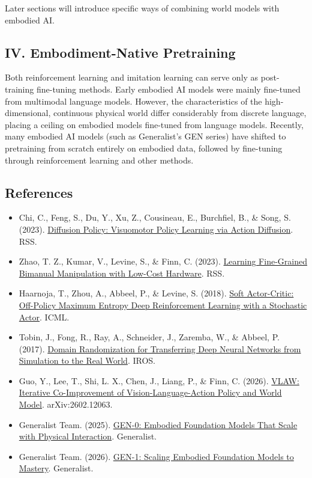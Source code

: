 Later sections will introduce specific ways of combining world models with embodied AI.

\hypertarget{iv.-embodiment-native-pretraining}{%
\subsection{IV. Embodiment-Native Pretraining}\label{iv.-embodiment-native-pretraining}}

Both reinforcement learning and imitation learning can serve only as post-training fine-tuning methods. Early embodied AI models were mainly fine-tuned from multimodal language models. However, the characteristics of the high-dimensional, continuous physical world differ considerably from discrete language, placing a ceiling on embodied models fine-tuned from language models. Recently, many embodied AI models (such as Generalist's GEN series) have shifted to pretraining from scratch entirely on embodied data, followed by fine-tuning through reinforcement learning and other methods.

\FloatBarrier
{}
\hypertarget{references-151}{%
\subsection{References}\label{references-151}}

\vspace{0.25em}
\begin{itemize}
\tightlist
\item
  Chi, C., Feng, S., Du, Y., Xu, Z., Cousineau, E., Burchfiel, B., \& Song, S. (2023). \href{https://arxiv.org/abs/2303.04137}{Diffusion Policy: Visuomotor Policy Learning via Action Diffusion}. RSS.
\item
  Zhao, T. Z., Kumar, V., Levine, S., \& Finn, C. (2023). \href{https://arxiv.org/abs/2304.13705}{Learning Fine-Grained Bimanual Manipulation with Low-Cost Hardware}. RSS.
\item
  Haarnoja, T., Zhou, A., Abbeel, P., \& Levine, S. (2018). \href{https://proceedings.mlr.press/v80/haarnoja18b.html}{Soft Actor-Critic: Off-Policy Maximum Entropy Deep Reinforcement Learning with a Stochastic Actor}. ICML.
\item
  Tobin, J., Fong, R., Ray, A., Schneider, J., Zaremba, W., \& Abbeel, P. (2017). \href{https://arxiv.org/abs/1703.06907}{Domain Randomization for Transferring Deep Neural Networks from Simulation to the Real World}. IROS.
\item
  Guo, Y., Lee, T., Shi, L. X., Chen, J., Liang, P., \& Finn, C. (2026). \href{https://arxiv.org/abs/2602.12063}{VLAW: Iterative Co-Improvement of Vision-Language-Action Policy and World Model}. arXiv:2602.12063.
\item
  Generalist Team. (2025). \href{https://generalistai.com/blog/gen-0}{GEN-0: Embodied Foundation Models That Scale with Physical Interaction}. Generalist.
\item
  Generalist Team. (2026). \href{https://generalistai.com/blog/gen-1}{GEN-1: Scaling Embodied Foundation Models to Mastery}. Generalist.
\end{itemize}

\clearpage

